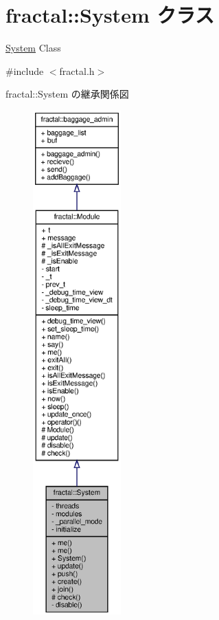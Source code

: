 \section{fractal\+:\+:System クラス}
\label{classfractal_1_1System}


\hyperlink{classfractal_1_1System}{System} Class  




{\ttfamily \#include $<$fractal.\+h$>$}



fractal\+:\+:System の継承関係図
\nopagebreak
\begin{figure}[H]
\begin{center}
\leavevmode
\includegraphics[height=550pt]{classfractal_1_1System__inherit__graph}
\end{center}
\end{figure}


